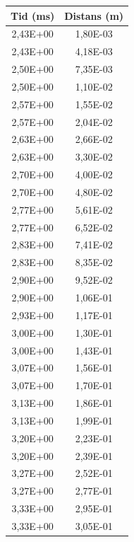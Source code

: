 \documentclass[11p, titlepage, oneside, a4paper]{article}
\begin{document}
        \begin{table}
            \begin{center}
            \begin{tabular}{ |c|c| } 
                \hline
                Tid (ms) & Distans (m)  \\
                \hline
                2,43E+00 & 1,80E-03 \\
                2,43E+00 & 4,18E-03 \\
                2,50E+00 & 7,35E-03 \\
                2,50E+00 & 1,10E-02 \\
                2,57E+00 & 1,55E-02 \\
                2,57E+00 & 2,04E-02 \\
                2,63E+00 & 2,66E-02 \\
                2,63E+00 & 3,30E-02 \\
                2,70E+00 & 4,00E-02 \\
                2,70E+00 & 4,80E-02 \\
                2,77E+00 & 5,61E-02 \\
                2,77E+00 & 6,52E-02 \\
                2,83E+00 & 7,41E-02 \\
                2,83E+00 & 8,35E-02 \\
                2,90E+00 & 9,52E-02 \\
                2,90E+00 & 1,06E-01 \\
                2,93E+00 & 1,17E-01 \\
                3,00E+00 & 1,30E-01 \\
                3,00E+00 & 1,43E-01 \\
                3,07E+00 & 1,56E-01 \\
                3,07E+00 & 1,70E-01 \\
                3,13E+00 & 1,86E-01 \\
                3,13E+00 & 1,99E-01 \\
                3,20E+00 & 2,23E-01 \\
                3,20E+00 & 2,39E-01 \\
                3,27E+00 & 2,52E-01 \\
                3,27E+00 & 2,77E-01 \\
                3,33E+00 & 2,95E-01 \\
                3,33E+00 & 3,05E-01 \\

\end{tabular}
\end{center}
\end{table}
\end{document}
